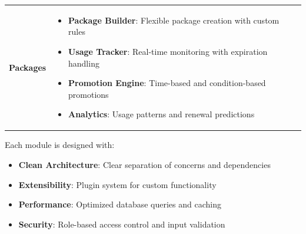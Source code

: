 \begin{center}
\begin{longtable}{p{}p{}}
    \textbf{Packages} & 
    \begin{itemize}[leftmargin=*]
        \item \textbf{Package Builder}: Flexible package creation with custom rules
        \item \textbf{Usage Tracker}: Real-time monitoring with expiration handling
        \item \textbf{Promotion Engine}: Time-based and condition-based promotions
        \item \textbf{Analytics}: Usage patterns and renewal predictions
    \end{itemize} \\
\end{longtable}
\end{center}

Each module is designed with:
\begin{itemize}
    \item \textbf{Clean Architecture}: Clear separation of concerns and dependencies
    \item \textbf{Extensibility}: Plugin system for custom functionality
    \item \textbf{Performance}: Optimized database queries and caching
    \item \textbf{Security}: Role-based access control and input validation
\end{itemize}
